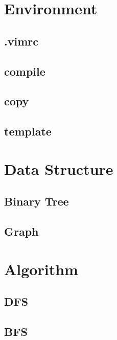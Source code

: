 \documentclass[a4paper, landscape, 8pt]{article}
\begin{document}
\begin{multicols*}{3}
\maketitle
\tableofcontents

\section{Environment}
\subsection{.vimrc}

\subsection{compile}

\subsection{copy}

\subsection{template}



\section{Data Structure}
\subsection{Binary Tree}

\subsection{Graph}


\section{Algorithm}
\subsection{DFS}

\subsection{BFS}



\end{multicols*}
\end{document}
